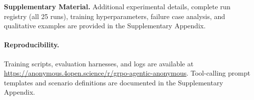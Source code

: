 \documentclass{article}
\begin{document}
\medskip

\textbf{Supplementary Material.} Additional experimental details, complete run registry (all 25 runs), training hyperparameters, failure case analysis, and qualitative examples are provided in the Supplementary Appendix.

\paragraph{Reproducibility.} Training scripts, evaluation harnesses, and logs are available at \url{https://anonymous.4open.science/r/grpo-agentic-anonymous}. Tool-calling prompt templates and scenario definitions are documented in the Supplementary Appendix.



\end{document}
